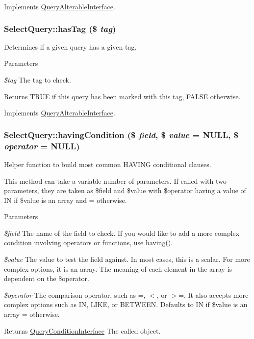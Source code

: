 Implements \hyperlink{interfaceQueryAlterableInterface_ae52ceaffc7ad7cf7f2b0542e8d55b3f1}{QueryAlterableInterface}.\hypertarget{classSelectQuery_a1d85219dc7e79cbff77c0b86a5861ddc}{
\subsubsection[{hasTag}]{\setlength{\rightskip}{0pt plus 5cm}SelectQuery::hasTag (\$ {\em tag})}}
\label{classSelectQuery_a1d85219dc7e79cbff77c0b86a5861ddc}
Determines if a given query has a given tag.


\begin{DoxyParams}{Parameters}
\item[{\em \$tag}]The tag to check.\end{DoxyParams}
\begin{DoxyReturn}{Returns}
TRUE if this query has been marked with this tag, FALSE otherwise. 
\end{DoxyReturn}


Implements \hyperlink{interfaceQueryAlterableInterface_a1273bb283ebfe44b6c839d97b18056a9}{QueryAlterableInterface}.\hypertarget{classSelectQuery_a99fb631e9ddd64677d84c9e60855a6f7}{
\subsubsection[{havingCondition}]{\setlength{\rightskip}{0pt plus 5cm}SelectQuery::havingCondition (\$ {\em field}, \/  \$ {\em value} = {\ttfamily NULL}, \/  \$ {\em operator} = {\ttfamily NULL})}}
\label{classSelectQuery_a99fb631e9ddd64677d84c9e60855a6f7}
Helper function to build most common HAVING conditional clauses.

This method can take a variable number of parameters. If called with two parameters, they are taken as \$field and \$value with \$operator having a value of IN if \$value is an array and = otherwise.


\begin{DoxyParams}{Parameters}
\item[{\em \$field}]The name of the field to check. If you would like to add a more complex condition involving operators or functions, use having(). \item[{\em \$value}]The value to test the field against. In most cases, this is a scalar. For more complex options, it is an array. The meaning of each element in the array is dependent on the \$operator. \item[{\em \$operator}]The comparison operator, such as =, $<$, or $>$=. It also accepts more complex options such as IN, LIKE, or BETWEEN. Defaults to IN if \$value is an array = otherwise. \end{DoxyParams}
\begin{DoxyReturn}{Returns}
\hyperlink{interfaceQueryConditionInterface}{QueryConditionInterface} The called object. 
\end{DoxyReturn}


